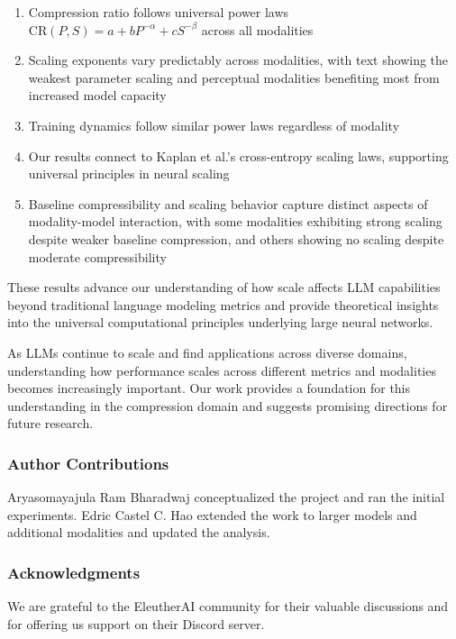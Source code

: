 \documentclass[10pt]{article} %
\begin{document}
\begin{enumerate}
\item Compression ratio follows universal power laws $\mathrm{CR}(P,S) = a + bP^{-\alpha} + cS^{-\beta}$ across all modalities
\item Scaling exponents vary predictably across modalities, with text showing the weakest parameter scaling and perceptual modalities benefiting most from increased model capacity
\item Training dynamics follow similar power laws regardless of modality
\item Our results connect to Kaplan et al.'s cross-entropy scaling laws, supporting universal principles in neural scaling
\item Baseline compressibility and scaling behavior capture distinct aspects of modality-model interaction, with some modalities exhibiting strong scaling despite weaker baseline compression, and others showing no scaling despite moderate compressibility
\end{enumerate}

These results advance our understanding of how scale affects LLM capabilities beyond traditional language modeling metrics and provide theoretical insights into the universal computational principles underlying large neural networks.

As LLMs continue to scale and find applications across diverse domains, understanding how performance scales across different metrics and modalities becomes increasingly important. Our work provides a foundation for this understanding in the compression domain and suggests promising directions for future research.

\subsubsection*{Author Contributions}
Aryasomayajula Ram Bharadwaj conceptualized the project and ran the initial experiments. Edric Castel C. Hao extended the work to larger models and additional modalities and updated the analysis.

\subsubsection*{Acknowledgments}
We are grateful to the EleutherAI community for their valuable discussions and for offering us support on their Discord server.



\end{document}
